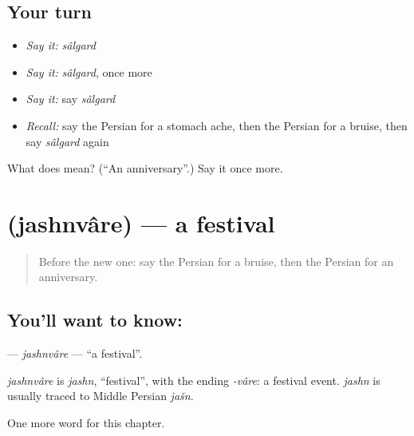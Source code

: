 \subsection*{Your turn}
\begin{itemize}
\raggedright
  \item \emph{Say it:} \emph{sâlgard}
  \item \emph{Say it:} \emph{sâlgard}, once more
  \item \emph{Say it:} say \emph{sâlgard}
  \item \emph{Recall:} say the Persian for a stomach ache, then the Persian for a bruise, then say \emph{sâlgard} again
\end{itemize}

\begin{tcolorbox}[breakable,colback=teal!4,colframe=teal!35!black,title={Before you move on}]
What does  mean? (\textquotedblleft{}An anniversary\textquotedblright{}.) Say it once more.
\end{tcolorbox}
\section[\texorpdfstring{\fa{جشنواره} (jashnvâre)}{جشنواره (jashnvâre)}]{ (jashnvâre) — a festival}

\label{lesson:FA-C264-jashnvare}



\begin{quote}
Before the new one: say the Persian for a bruise, then the Persian for an anniversary.
\end{quote}

\subsection*{You'll want to know: }
\textbf{} — \emph{jashnvâre} — \textquotedblleft{}a festival\textquotedblright{}.

\begin{cousinweb}
\emph{jashnvâre} is \emph{jashn}, \textquotedblleft{}festival\textquotedblright{}, with the ending \emph{-vâre}: a festival event. \emph{jashn} is usually traced to Middle Persian \emph{jašn}.
\end{cousinweb}

\begin{grammarlens}[title={What you've built}]
One more word for this chapter.
\end{grammarlens}

